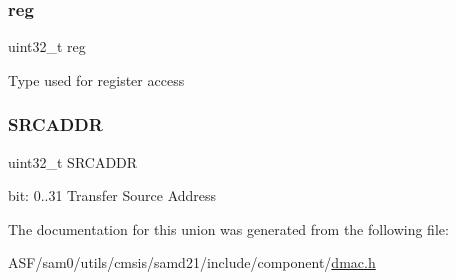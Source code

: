 \subsubsection{\texorpdfstring{reg}{reg}}
{\footnotesize\ttfamily uint32\+\_\+t reg}

Type used for register access \mbox{\label{union_d_m_a_c___s_r_c_a_d_d_r___type_ac1acf36eba231287ff62ee68a8ccf833}} 
\subsubsection{\texorpdfstring{SRCADDR}{SRCADDR}}
{\footnotesize\ttfamily uint32\+\_\+t S\+R\+C\+A\+D\+DR}

bit\+: 0..31 Transfer Source Address 

The documentation for this union was generated from the following file\+:\begin{DoxyCompactItemize}
\item 
A\+S\+F/sam0/utils/cmsis/samd21/include/component/\mbox{\hyperlink{component_2dmac_8h}{dmac.\+h}}\end{DoxyCompactItemize}
